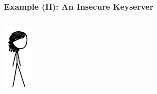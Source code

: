 \documentclass[12pt,english,dvipsnames]{beamer}
\newcommand{\red}[1]{{\color{red}#1}}
\begin{document}
\begin{frame}[fragile]
    \frametitle{Example (II): An \red{Insecure} Keyserver}

    \begin{columns}[b]
        \begin{column}{1.5cm}
        \includegraphics[width=\textwidth]{images/meg.png}
        \end{column}


\end{columns}
\end{frame}
\end{document}
